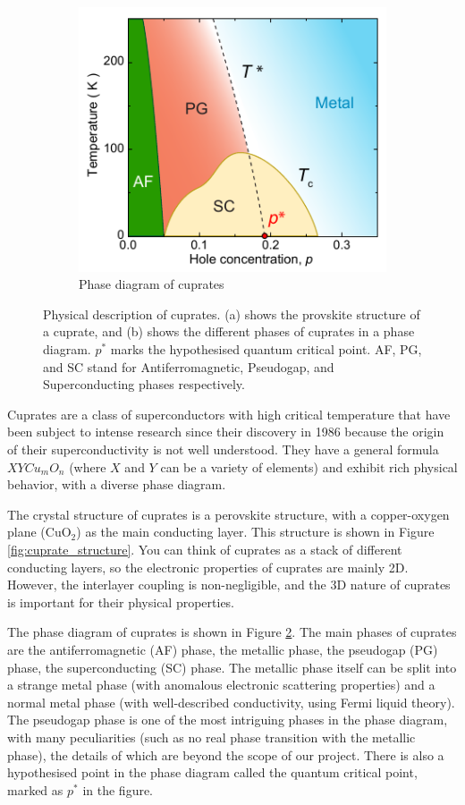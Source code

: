 \begin{figure}
\begin{subfigure}{0.5\textwidth}
        \includegraphics[width=\textwidth]{figures/phase_diagram}
        \caption{Phase diagram of cuprates}
        \label{fig:phase_diagram}
    \end{subfigure}
    \caption{Physical description of cuprates. (a) shows the provskite structure of a cuprate,
    and (b) shows the different phases of cuprates in a phase diagram. $p^*$ marks the hypothesised
    quantum critical point. AF, PG, and SC stand for Antiferromagnetic, Pseudogap, and
    Superconducting phases respectively.}
\end{figure}

Cuprates are a class of superconductors with high critical temperature that have been subject
to intense research since their discovery in 1986 because the origin of their superconductivity is not well understood. They have a general formula $XYCu_mO_n$ (where $X$ and $Y$ can be a variety of elements) and exhibit rich physical behavior, 
with a diverse phase diagram.

The crystal structure of cuprates is a perovskite structure, with a copper-oxygen plane
($\mathrm{CuO}_2$) as the main conducting layer. This structure is shown in Figure
\ref{fig:cuprate_structure}. You can think of cuprates as a stack of different conducting layers,
so the electronic properties of cuprates are mainly 2D. However, the interlayer coupling is
non-negligible, and the 3D nature of cuprates is important for their physical properties.

The phase diagram of cuprates is shown in Figure \ref{fig:phase_diagram}. The main phases of
cuprates are the antiferromagnetic (AF) phase, the metallic phase, the pseudogap (PG) phase,
the superconducting (SC) phase. 
The metallic phase itself can be split into a strange metal phase 
(with anomalous electronic scattering properties) and a normal metal phase 
(with well-described conductivity, using Fermi liquid theory).
The pseudogap phase is one of the most intriguing phases in the phase diagram, 
with many peculiarities (such as no real phase transition with the metallic phase), 
the details of which are beyond the scope of our project.
There is also a hypothesised point in the phase diagram called the quantum critical point, marked as $p^*$ in the figure.
